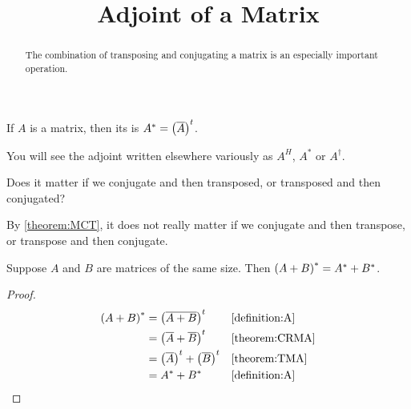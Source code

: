 \documentclass{ximera}
\title{Adjoint of a Matrix}
\begin{document}
\begin{abstract}
  The combination of transposing and conjugating a matrix is an especially important operation.
\end{abstract}
\maketitle

\begin{definition}[Adjoint]
If $A$ is a matrix, then its  is
$A^\ast=\left(\overline{A}\right)^{t}$.
\end{definition}

You will see the adjoint written elsewhere variously as $A^H$,
$A^\ast$ or $A^\dagger$.

\begin{question}
  Does it matter if we conjugate and then transposed, or transposed
  and then conjugated?

  \begin{multipleChoice}
  \end{multipleChoice}

  \begin{feedback}[correct]
    By \ref{theorem:MCT}, it does not really matter if we conjugate
    and then transpose, or transpose and then conjugate.
  \end{feedback}

\end{question}

\begin{theorem}
\label{theorem:AMA}

Suppose $A$ and $B$ are matrices of the same size.  Then $\left(A+B\right)^\ast=A^\ast+B^\ast$.

\begin{proof}

  \begin{align*}
    \left(A+B\right)^\ast
    &=\left(\overline{A+B}\right)^{t}
    &&\ref{definition:A}\\
    &=\left(\overline{A}+\overline{B}\right)^{t}
    &&\ref{theorem:CRMA}\\
    &=\left(\overline{A}\right)^{t}+\left(\overline{B}\right)^{t}
    &&\ref{theorem:TMA}\\
    &=A^\ast+B^\ast
    &&\ref{definition:A}
  \end{align*}
\end{proof}
\end{theorem}
\end{document}
